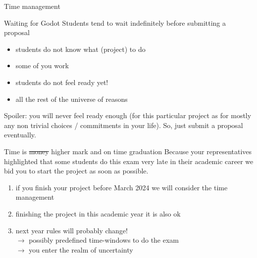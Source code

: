 \documentclass[presentation]{beamer}\mode<presentation>{\usetheme{AMSBolognaFC}}
\begin{document}
\begin{frame}[c,allowframebreaks]{Time management}
    \begin{block}{Waiting for Godot}
        Students tend to wait indefinitely before submitting a proposal
        \begin{itemize}
            \item students do not know what (project) to do
            \item some of you work
            \item \alert{students do not feel ready yet!}
            \item all the rest of the universe of reasons
        \end{itemize}
    \end{block}
    Spoiler: you will never feel ready enough (for this particular project as for mostly any non trivial choices / commitments in your life).
    So, just submit a proposal eventually.
    
    \framebreak
    
    \begin{block}{Time is \st{money} higher mark and on time graduation}
        Because your representatives highlighted that some students do this exam very late in their academic career we bid you to start the project as soon as possible.
        \begin{enumerate}
            \item if you finish your project before March 2024 we will consider the time management {\color{green}{very positively}}
            \item finishing the project in this academic year it is also ok
            \item next year rules will probably change!
            \\
            $\rightarrow$ possibly predefined time-windows to do the exam
            \\
            $\rightarrow$ you enter the realm of \alert{uncertainty}
        \end{enumerate}
    \end{block}
    
\end{frame}
\end{document}
